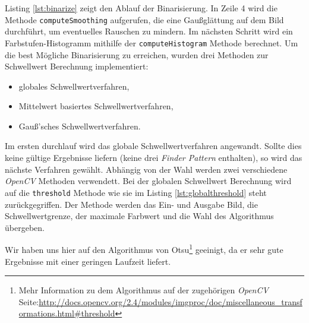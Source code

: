 Listing \ref{lst:binarize} zeigt den Ablauf der Binarisierung. In Zeile 4 wird die Methode \texttt{computeSmoothing} aufgerufen, die eine Gaußglättung auf dem Bild durchführt, um eventuelles Rauschen zu mindern. Im nächsten Schritt wird ein Farbstufen-Histogramm mithilfe der \texttt{computeHistogram} Methode berechnet. Um die best Mögliche Binarisierung zu erreichen, wurden drei Methoden zur Schwellwert Berechnung implementiert:
\begin{itemize}
	\item globales Schwellwertverfahren,
	\item Mittelwert basiertes Schwellwertverfahren,
	\item Gauß'sches Schwellwertverfahren.
\end{itemize} 
Im ersten durchlauf wird das globale Schwellwertverfahren angewandt. Sollte dies keine gültige Ergebnisse liefern (keine drei \emph{Finder Pattern} enthalten), so wird das nächste Verfahren gewählt.
Abhängig von der Wahl werden zwei verschiedene \emph{OpenCV} Methoden verwendett. Bei der globalen Schwellwert Berechnung wird auf die \texttt{threshold} Methode wie sie im Listing \ref{lst:globalthreshold} steht zurückgegriffen. Der Methode werden das Ein- und Ausgabe Bild, die Schwellwertgrenze, der maximale Farbwert und die Wahl des Algorithmus übergeben. 

Wir haben uns hier auf den Algorithmus von Otsu\footnote{Mehr Information zu dem Algorithmus auf der zugehörigen \emph{OpenCV} Seite:\url{http://docs.opencv.org/2.4/modules/imgproc/doc/miscellaneous_transformations.html\#threshold}} geeinigt, da er sehr gute Ergebnisse mit einer geringen Laufzeit liefert.

